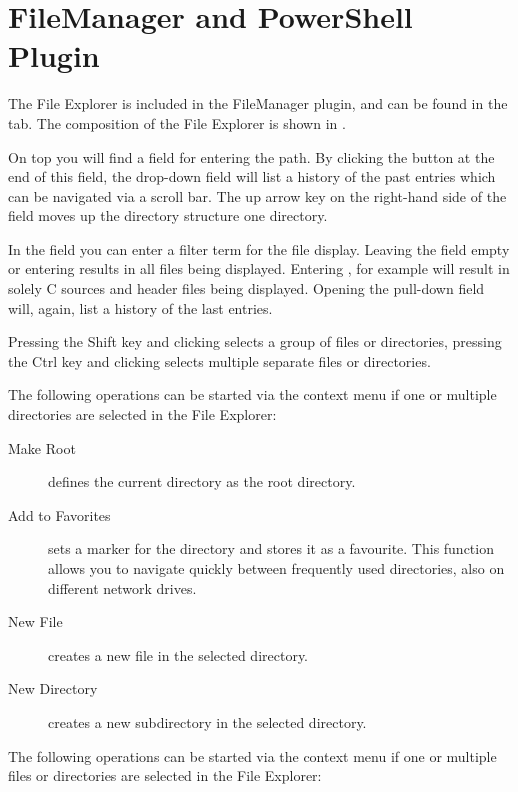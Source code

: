 \section{FileManager and PowerShell Plugin}\label{sec:file_explorer}

The File Explorer  is included in the FileManager plugin, and can be found in the  tab. The composition of the File Explorer is shown in .

On top you will find a field for entering the path. By clicking the button at the end of this field, the drop-down field will list a history of the past entries which can be navigated via a scroll bar. The up arrow key on the right-hand side of the field moves up the directory structure one directory.

In the  field you can enter a filter term for the file display. Leaving the field empty or entering \codeline{*} results in all files being displayed. Entering , for example will result in solely C sources and header files being displayed. Opening the pull-down field will, again, list a history of the last entries.


Pressing the Shift key and clicking selects a group of files or directories, pressing the Ctrl key and clicking selects multiple separate files or directories.

The following operations can be started via the context menu if one or multiple directories are selected in the File Explorer:

\begin{description}
\item[Make Root] defines the current directory as the root directory.
\item[Add to Favorites] sets a marker for the directory and stores it as a favourite. This function allows you to navigate quickly between frequently used directories, also on different network drives.
\item[New File] creates a new file in the selected directory.
\item[New Directory] creates a new subdirectory in the selected directory.
\end{description}

The following operations can be started via the context menu if one or multiple files or directories are selected in the File Explorer:

